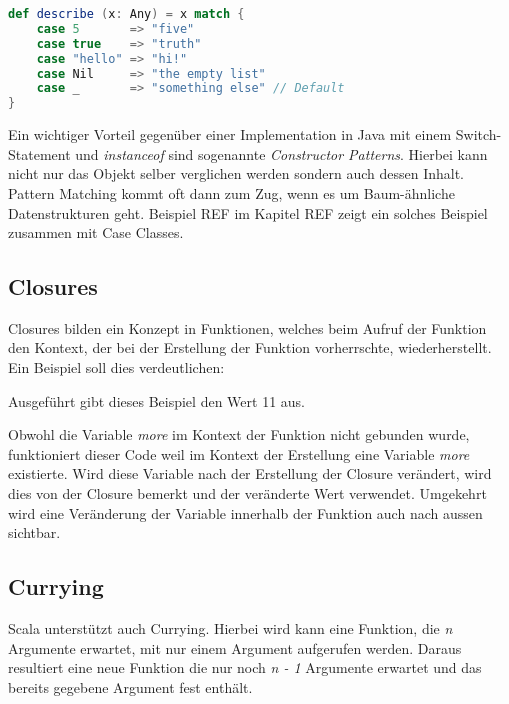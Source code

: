 \begin{lstlisting}[float=ht,language=scala,caption=Pattern Matching auf Literale \cite{odersky},label=lst:patternMatching]
def describe (x: Any) = x match {
	case 5       => "five"
	case true    => "truth"
	case "hello" => "hi!"
	case Nil     => "the empty list"
	case _       => "something else" // Default
}
\end{lstlisting}

Ein wichtiger Vorteil gegenüber einer Implementation in Java mit
einem Switch-Statement und \emph{instanceof} sind sogenannte 
\emph{Constructor Patterns}. Hierbei kann nicht nur das Objekt selber
verglichen werden sondern auch dessen Inhalt. \\

Pattern Matching kommt oft dann zum Zug, wenn es um Baum-ähnliche
Datenstrukturen geht. Beispiel REF im Kapitel REF zeigt ein solches
Beispiel zusammen mit Case Classes.

\subsection{Closures}

Closures bilden ein Konzept in Funktionen, welches beim Aufruf der 
Funktion den Kontext, der bei der Erstellung der Funktion vorherrschte,
wiederherstellt. \\

Ein Beispiel soll dies verdeutlichen:



Ausgeführt gibt dieses Beispiel den Wert 11 aus.

Obwohl die Variable \emph{more} im Kontext der Funktion nicht gebunden
wurde, funktioniert dieser Code weil im Kontext der Erstellung eine
Variable \emph{more} existierte. Wird diese Variable nach der
Erstellung der Closure verändert, wird dies von der Closure bemerkt und 
der veränderte Wert verwendet. Umgekehrt wird eine Veränderung der
Variable innerhalb der Funktion auch nach aussen sichtbar.

\subsection{Currying}

Scala unterstützt auch Currying. Hierbei wird kann eine Funktion,
die \emph{n} Argumente erwartet, mit nur einem Argument aufgerufen werden. 
Daraus resultiert eine neue Funktion die nur noch \emph{n - 1} Argumente
erwartet und das bereits gegebene Argument fest enthält.\\

